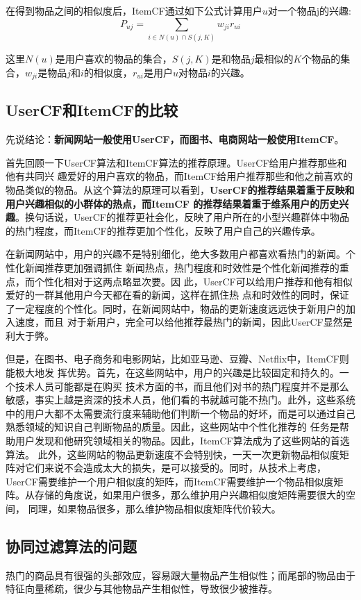 \documentclass[12pt]{article}
\begin{document}
在得到物品之间的相似度后，ItemCF通过如下公式计算用户$u$对一个物品j的兴趣:
$$
P_{uj} = \sum_{i \in N(u) \cap S(j,K)}w_{ji}r_{ui}
$$

这里$N(u)$是用户喜欢的物品的集合，$S(j,K)$是和物品$j$最相似的$K$个物品的集合，$w_{ji}$是物品$j$和$i$的相似度，$r_{ui}$是用户$u$对物品$i$的兴趣。

\subsection{UserCF和ItemCF的比较}
先说结论：\textbf{新闻网站一般使用UserCF，而图书、电商网站一般使用ItemCF}。

首先回顾一下UserCF算法和ItemCF算法的推荐原理。UserCF给用户推荐那些和他有共同兴 趣爱好的用户喜欢的物品，而ItemCF给用户推荐那些和他之前喜欢的物品类似的物品。从这个算法的原理可以看到，\textbf{UserCF的推荐结果着重于反映和用户兴趣相似的小群体的热点，而ItemCF 的推荐结果着重于维系用户的历史兴趣}。换句话说，UserCF的推荐更社会化，反映了用户所在的小型兴趣群体中物品的热门程度，而ItemCF的推荐更加个性化，反映了用户自己的兴趣传承。

在新闻网站中，用户的兴趣不是特别细化，绝大多数用户都喜欢看热门的新闻。个性化新闻推荐更加强调抓住 新闻热点，热门程度和时效性是个性化新闻推荐的重点，而个性化相对于这两点略显次要。因 此，UserCF可以给用户推荐和他有相似爱好的一群其他用户今天都在看的新闻，这样在抓住热 点和时效性的同时，保证了一定程度的个性化。同时，在新闻网站中，物品的更新速度远远快于新用户的加入速度，而且 对于新用户，完全可以给他推荐最热门的新闻，因此UserCF显然是利大于弊。

但是，在图书、电子商务和电影网站，比如亚马逊、豆瓣、Netflix中，ItemCF则能极大地发 挥优势。首先，在这些网站中，用户的兴趣是比较固定和持久的。一个技术人员可能都是在购买 技术方面的书，而且他们对书的热门程度并不是那么敏感，事实上越是资深的技术人员，他们看的书就越可能不热门。此外，这些系统中的用户大都不太需要流行度来辅助他们判断一个物品的好坏，而是可以通过自己熟悉领域的知识自己判断物品的质量。因此，这些网站中个性化推荐的 任务是帮助用户发现和他研究领域相关的物品。因此，ItemCF算法成为了这些网站的首选算法。 此外，这些网站的物品更新速度不会特别快，一天一次更新物品相似度矩阵对它们来说不会造成太大的损失，是可以接受的。同时，从技术上考虑，UserCF需要维护一个用户相似度的矩阵，而ItemCF需要维护一个物品相似度矩阵。从存储的角度说，如果用户很多，那么维护用户兴趣相似度矩阵需要很大的空间， 同理，如果物品很多，那么维护物品相似度矩阵代价较大。

\subsection{协同过滤算法的问题}
热门的商品具有很强的头部效应，容易跟大量物品产生相似性；而尾部的物品由于特征向量稀疏，很少与其他物品产生相似性，导致很少被推荐。
\end{document}
